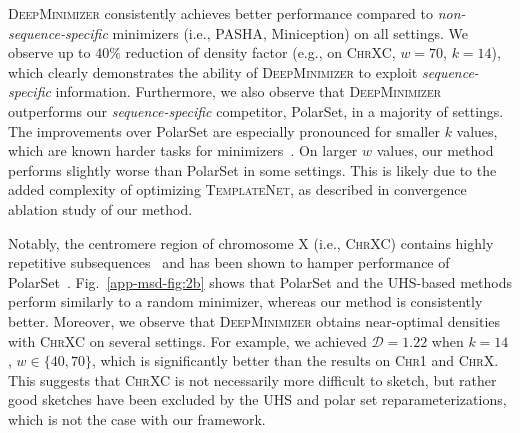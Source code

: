 \noindent \textsc{DeepMinimizer} consistently achieves better performance compared to \textit{non-sequence-specific} minimizers (i.e., PASHA, Miniception) on all settings. We observe up to $40\%$ reduction of density factor (e.g., on \textsc{ChrXC}, $w=70$, $k=14$), which clearly demonstrates the ability of \textsc{DeepMinimizer} to exploit \textit{sequence-specific} information. Furthermore, we also observe that \textsc{DeepMinimizer} outperforms our \textit{sequence-specific} competitor, PolarSet, in a majority of settings. The improvements over PolarSet are especially pronounced for smaller $k$ values, which are known harder tasks for minimizers~\citep{zheng20miniception}. On larger $w$ values, our method performs slightly worse than PolarSet in some settings. This is likely due to the added complexity of optimizing \textsc{TemplateNet}, as described in convergence ablation study of our method.

Notably, the centromere region of chromosome X (i.e., \textsc{ChrXC}) contains highly repetitive subsequences~\citep{fukagawa14} and has been shown to hamper performance of PolarSet~\citep{zheng21}. Fig.~\ref{app-msd-fig:2b} shows that PolarSet and the UHS-based methods perform similarly to a random minimizer, whereas our method is consistently better. Moreover, we observe that \textsc{DeepMinimizer} obtains near-optimal densities with \textsc{ChrXC} on several settings. For example, we achieved $\mathcal{D}=1.22$ when $k=14$, $w\in \{40,70\}$, which is significantly better than the results on \textsc{Chr1} and \textsc{ChrX}. This suggests that \textsc{ChrXC} is not necessarily more difficult to sketch, but rather good sketches have been excluded by the UHS and polar set reparameterizations, which is not the case with our framework.

